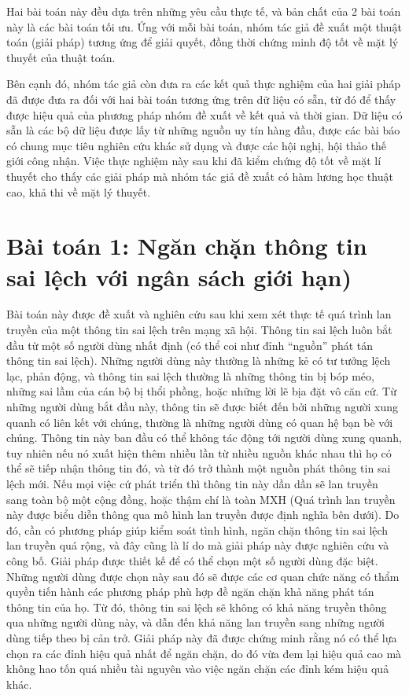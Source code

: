 Hai bài toán này đều dựa trên những yêu cầu thực tế, và bản chất của 2 bài toán này là các bài toán tối ưu. Ứng với mỗi bài toán, nhóm tác giả đề xuất một thuật toán (giải pháp) tương ứng để giải quyết, đồng thời chứng minh độ tốt về mặt lý thuyết của thuật toán.

Bên cạnh đó, nhóm tác giả còn đưa ra các kết quả thực nghiệm của hai giải pháp đã được đưa ra đối với hai bài toán tương ứng trên dữ liệu có sẵn, từ đó để thấy được hiệu quả của phương pháp nhóm đề xuất về kết quả và thời gian. Dữ liệu có sẵn là các bộ dữ liệu được lấy từ những nguồn uy tín hàng đầu, được các bài báo có chung mục tiêu nghiên cứu khác sử dụng và được các hội nghị, hội thảo thế giới công nhận. Việc thực nghiệm này sau khi đã kiểm chứng độ tốt về mặt lí thuyết cho thấy các giải pháp mà nhóm tác giả đề xuất có hàm lương học thuật cao, khả thi về mặt lý thuyết.

\section{Bài toán 1: Ngăn chặn thông tin sai lệch với ngân sách giới hạn)}
Bài toán này được đề xuất và nghiên cứu sau khi xem xét thực tế quá trình lan truyền của một thông tin sai lệch trên mạng xã hội. Thông tin sai lệch luôn bắt đầu từ một số người dùng nhất định (có thể coi như đỉnh “nguồn” phát tán thông tin sai lệch). Những người dùng này thường là những kẻ có tư tưởng lệch lạc, phản động, và thông tin sai lệch thường là những thông tin bị bóp méo, những sai lầm của cán bộ bị thổi phồng, hoặc những lời lẽ bịa đặt vô căn cứ. Từ những người dùng bắt đầu này, thông tin sẽ được biết đến bởi những người xung quanh có liên kết với chúng, thường là những người dùng có quan hệ bạn bè với chúng. Thông tin này ban đầu có thể không tác động tới người dùng xung quanh, tuy nhiên nếu nó xuất hiện thêm nhiều lần từ nhiều nguồn khác nhau thì họ có thể sẽ tiếp nhận thông tin đó, và từ đó trở thành một nguồn phát thông tin sai lệch mới. Nếu mọi việc cứ phát triển thì thông tin này dần dần sẽ lan truyền sang toàn bộ một cộng đồng, hoặc thậm chí là toàn MXH (Quá trình lan truyền này được biểu diễn thông qua mô hình lan truyền được định nghĩa bên dưới). Do đó, cần có phương pháp giúp kiểm soát tình hình, ngăn chặn thông tin sai lệch lan truyền quá rộng, và đây cũng là lí do mà giải pháp này được nghiên cứu và công bố. Giải pháp được thiết kế để có thể chọn một số người dùng đặc biệt. Những người dùng được chọn này sau đó sẽ được các cơ quan chức năng có thẩm quyền tiến hành các phương pháp phù hợp đề ngăn chặn khả năng phát tán thông tin của họ. Từ đó, thông tin sai lệch sẽ không có khả năng truyền thông qua những người dùng này, và dẫn đến khả năng lan truyền sang những người dùng tiếp theo bị cản trở. Giải pháp này đã được chứng minh rằng nó có thể lựa chọn ra các đỉnh hiệu quả nhất để ngăn chặn, do đó vừa đem lại hiệu quả cao mà không hao tốn quá nhiều tài nguyên vào việc ngăn chặn các đỉnh kém hiệu quả khác.
